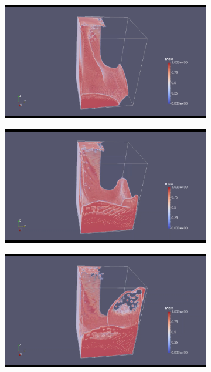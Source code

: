\documentclass[10pt,a4paper,notitlepage]{article}
\begin{document}
\begin{figure}[H]
\begin{subfigure}{0.25\textwidth}
  \includegraphics[width=1.0\linewidth]{dam/3.png}
\end{subfigure}
\centering
\begin{subfigure}{0.25\textwidth}
  \includegraphics[width=1.0\linewidth]{dam/4.png}
\end{subfigure}%
\begin{subfigure}{0.25\textwidth}
  \includegraphics[width=1.0\linewidth]{dam/5.png}

\end{subfigure}
\end{figure}
\end{document}
